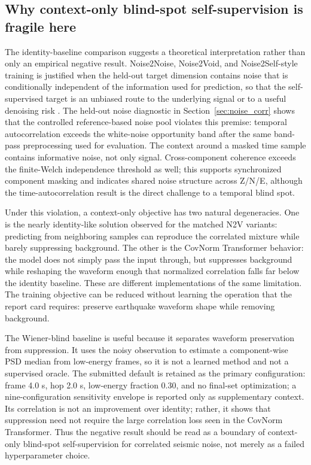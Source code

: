 \documentclass[review,12pt,authoryear]{elsarticle}
\begin{document}
\subsection{Why context-only blind-spot self-supervision is fragile here}
The identity-baseline comparison suggests a theoretical interpretation rather than only an empirical negative result. Noise2Noise, Noise2Void, and Noise2Self-style training is justified when the held-out target dimension contains noise that is conditionally independent of the information used for prediction, so that the self-supervised target is an unbiased route to the underlying signal or to a useful denoising risk \citep{batson2019,krull2019,lehtinen2018}. The held-out noise diagnostic in Section~\ref{sec:noise_corr} shows that the controlled reference-based noise pool violates this premise: temporal autocorrelation exceeds the white-noise opportunity band after the same band-pass preprocessing used for evaluation. The context around a masked time sample contains informative noise, not only signal. Cross-component coherence exceeds the finite-Welch independence threshold as well; this supports synchronized component masking and indicates shared noise structure across Z/N/E, although the time-autocorrelation result is the direct challenge to a temporal blind spot.

Under this violation, a context-only objective has two natural degeneracies. One is the nearly identity-like solution observed for the matched N2V variants: predicting from neighboring samples can reproduce the correlated mixture while barely suppressing background. The other is the CovNorm Transformer behavior: the model does not simply pass the input through, but suppresses background while reshaping the waveform enough that normalized correlation falls far below the identity baseline. These are different implementations of the same limitation. The training objective can be reduced without learning the operation that the report card requires: preserve earthquake waveform shape while removing background.

The Wiener-blind baseline is useful because it separates waveform preservation from suppression. It uses the noisy observation to estimate a component-wise PSD median from low-energy frames, so it is not a learned method and not a supervised oracle. The submitted default is retained as the primary configuration: frame 4.0 s, hop 2.0 s, low-energy fraction 0.30, and no final-set optimization; a nine-configuration sensitivity envelope is reported only as supplementary context. Its correlation is not an improvement over identity; rather, it shows that suppression need not require the large correlation loss seen in the CovNorm Transformer. Thus the negative result should be read as a boundary of context-only blind-spot self-supervision for correlated seismic noise, not merely as a failed hyperparameter choice.
\end{document}
